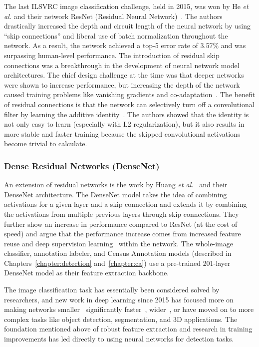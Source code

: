 The last ILSVRC image classification challenge, held in 2015, was won by He \textit{et al.} and their network ResNet (Residual Neural Network)~\cite{he_deep_2015}.  The authors drastically increased the depth and circuit length of the neural network by using ``skip connections'' and liberal use of batch normalization throughout the network. As a result, the network achieved a top-5 error rate of 3.57\% and was surpassing human-level performance.  The introduction of residual skip connections was a breakthrough in the development of neural network model architectures.  The chief design challenge at the time was that deeper networks were shown to increase performance, but increasing the depth of the network caused training problems like vanishing gradients and co-adaptation~\cite{pascanu_difficulty_2013,lee_deeply-supervised_2014,glorot_deep_2011}.  The benefit of residual connections is that the network can selectively turn off a convolutional filter by learning the additive identity~\cite{he_identity_2016}.  The authors showed that the identity is not only easy to learn (especially with L2 regularization), but it also results in more stable and faster training because the skipped convolutional activations become trivial to calculate.

\subsubsection{Dense Residual Networks (DenseNet)}

An extension of residual networks is the work by Huang \textit{et al.}~\cite{huang_densely_2016} and their DenseNet architecture.  The DenseNet model takes the idea of combining activations for a given layer and a skip connection and extends it by combining the activations from multiple previous layers through skip connections.  They further show an increase in performance compared to ResNet (at the cost of speed) and argue that the performance increase comes from increased feature reuse and deep supervision learning~\cite{lee_deeply-supervised_2014} within the network.  The whole-image classifier, annotation labeler, and Census Annotation models (described in Chapters~\ref{chapter:detection} and~\ref{chapter:ca}) use a pre-trained 201-layer DenseNet model as their feature extraction backbone.

\vspace{0.5cm}

\noindent The image classification task has essentially been considered solved by researchers, and new work in deep learning since 2015 has focused more on making networks smaller~\cite{ma_shufflenet_2018,tan_mnasnet_2019,iandola_squeezenet:_2016} significantly faster~\cite{redmon_you_2016,hubara_binarized_2016,iandola_densenet:_2014}, wider~\cite{zagoruyko_wide_2016}, or have moved on to more complex tasks like object detection, segmentation, and 3D applications.  The foundation mentioned above of robust feature extraction and research in training improvements has led directly to using neural networks for detection tasks.

